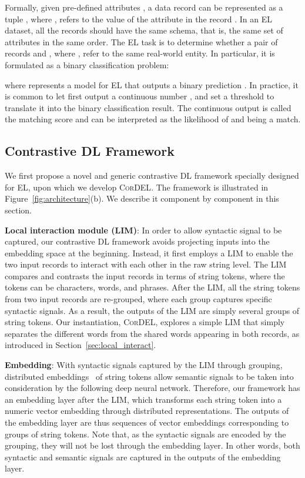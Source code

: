 \documentclass[conference]{IEEEtran}
\begin{document}
Formally, given pre-defined attributes , a data record  can be represented as a tuple , where ,  refers to the value of the attribute  in the record . In an EL dataset, all the records should have the same schema, that is, the same set of attributes in the same order. The EL task is to determine whether a pair of records  and , where , refer to the same real-world entity. In particular, it is formulated as a binary classification problem:

where  represents a model for EL that outputs a binary prediction . In practice, it is common to let  first output a continuous number , and set a threshold to translate it into the binary classification result. The continuous output is called the matching score and can be interpreted as the likelihood of  and  being a match.

\subsection{Contrastive DL Framework}\label{sec:framework}

We first propose a novel and generic contrastive DL framework specially designed for EL, upon which we develop \textsc{CorDEL}. The framework is illustrated in Figure~\ref{fig:architecture}(b). We describe it component by component in this section.

\textbf{Local interaction module (LIM)}: In order to allow syntactic signal to be captured, our contrastive DL framework avoids projecting inputs into the embedding space at the beginning. Instead, it first employs a LIM to enable the two input records to interact with each other in the raw string level. The LIM compares and contrasts the input records in terms of string tokens, where the tokens can be characters, words, and phrases. After the LIM, all the string tokens from two input records are re-grouped, where each group captures specific syntactic signals. As a result, the outputs of the LIM are simply several groups of string tokens. Our instantiation, \textsc{CorDEL}, explores a simple LIM that simply separates the different words from the shared words appearing in both records, as introduced in Section~\ref{sec:local_interact}.

\textbf{Embedding}: With syntactic signals captured by the LIM through grouping, distributed embeddings~\cite{mikolov2013distributed,pennington2014glove,bojanowski2017enriching,joulin2017bag} of string tokens allow semantic signals to be taken into consideration by the following deep neural network. Therefore, our framework has an embedding layer after the LIM, which transforms each string token into a numeric vector embedding through distributed representations. The outputs of the embedding layer are thus sequences of vector embeddings corresponding to groups of string tokens. Note that, as the syntactic signals are encoded by the grouping, they will not be lost through the embedding layer. In other words, both syntactic and semantic signals are captured in the outputs of the embedding layer.
\end{document}
